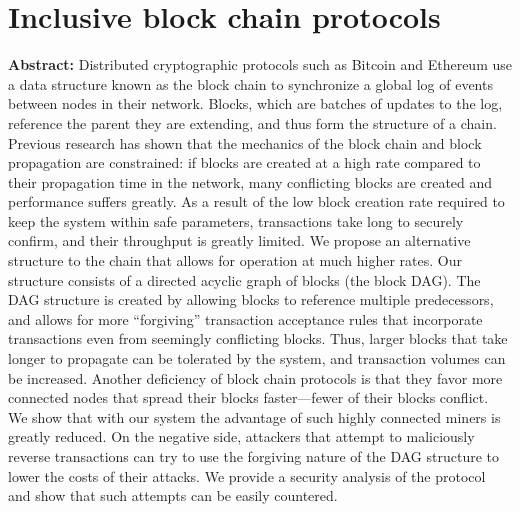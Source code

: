 \section{Inclusive block chain protocols }

\textbf{Abstract:} 
Distributed cryptographic protocols such as Bitcoin and Ethereum use a data structure known as the block chain to synchronize a global log of events between nodes in their network. Blocks, which are batches of updates to the log, reference the parent they are extending, and thus form the structure of a chain. Previous research has shown that the mechanics of the block chain and block propagation are constrained: if blocks are created at a high rate compared to their propagation time in the network, many conflicting blocks are created and performance suffers greatly. As a result of the low block creation rate required to keep the system within safe parameters, transactions take long to securely confirm, and their throughput is greatly limited. We propose an alternative structure to the chain that allows for operation at much higher rates. Our structure consists of a directed acyclic graph of blocks (the block DAG). The DAG structure is created by allowing blocks to reference multiple predecessors, and allows for more “forgiving” transaction acceptance rules that incorporate transactions even from seemingly conflicting blocks. Thus, larger blocks that take longer to propagate can be tolerated by the system, and transaction volumes can be increased. Another deficiency of block chain protocols is that they favor more connected nodes that spread their blocks faster—fewer of their blocks conflict. We show that with our system the advantage of such highly connected miners is greatly reduced. On the negative side, attackers that attempt to maliciously reverse transactions can try to use the forgiving nature of the DAG structure to lower the costs of their attacks. We provide a security analysis of the protocol and show that such attempts can be easily countered.
